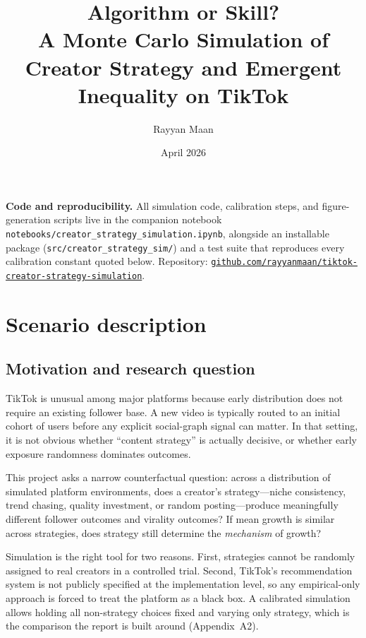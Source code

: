 \documentclass[10pt]{article}
\title{\vspace{-1.2em}
Algorithm or Skill?\\
\large A Monte Carlo Simulation of Creator Strategy and Emergent Inequality on TikTok}
\author{Rayyan Maan}
\date{April 2026}
\newcommand{\appref}[1]{(Appendix~#1)}
\begin{document}
\maketitle
\thispagestyle{plain}

\noindent\textbf{Code and reproducibility.}
All simulation code, calibration steps, and figure-generation scripts live in the companion
notebook \texttt{notebooks/creator\_strategy\_simulation.ipynb}, alongside an installable package
(\texttt{src/creator\_strategy\_sim/}) and a test suite that reproduces every calibration constant
quoted below. Repository: \href{https://github.com/rayyanmaan/tiktok-creator-strategy-simulation}{\texttt{github.com/rayyanmaan/tiktok-creator-strategy-simulation}}.

\tableofcontents
\vspace{0.5em}

\section{Scenario description}
\subsection{Motivation and research question}
TikTok is unusual among major platforms because early distribution does not require an existing follower base. A new video is typically routed to an initial cohort of users before any explicit social-graph signal can matter. In that setting, it is not obvious whether ``content strategy'' is actually decisive, or whether early exposure randomness dominates outcomes.

This project asks a narrow counterfactual question: across a distribution of simulated platform environments, does a creator's strategy---niche consistency, trend chasing, quality investment, or random posting---produce meaningfully different follower outcomes and virality outcomes? If mean growth is similar across strategies, does strategy still determine the \emph{mechanism} of growth?

Simulation is the right tool for two reasons. First, strategies cannot be randomly assigned to real creators in a controlled trial. Second, TikTok's recommendation system is not publicly specified at the implementation level, so any empirical-only approach is forced to treat the platform as a black box. A calibrated simulation allows holding all non-strategy choices fixed and varying only strategy, which is the comparison the report is built around \appref{A2}.
\end{document}
